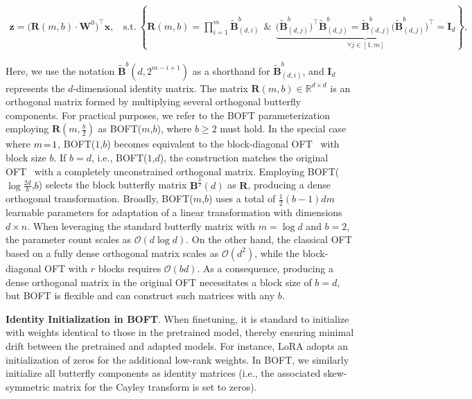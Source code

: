 \begin{equation}
    \begin{aligned}\nonumber
    \bm{z}=\big(\bm{R}(m,b)\cdot\bm{W}^0\big)^\top\bm{x},~~~~\text{s.t.}~\left\{\bm{R}(m,b)=\prod_{i=1}^m \tilde{\bm{B}}^b_{(d,i)}~~\&~~\underbrace{\big(\tilde{\bm{B}}^b_{(d,j)}\big)^\top\tilde{\bm{B}}^b_{(d,j)}=\tilde{\bm{B}}^b_{(d,j)}\big(\tilde{\bm{B}}^b_{(d,j)}\big)^\top\!=\bm{I}_d}_{\forall j\in [1, m]}\right\},
    \end{aligned}
\end{equation}

Here, we use the notation $\tilde{\bm{B}}^b(d,2^{m - i+1})$ as a shorthand for $\tilde{\bm{B}}^b_{(d,i)}$, and $\bm{I}_d$ represents the $d$-dimensional identity matrix. The matrix $\bm{R}(m,b)\in\mathbb{R}^{d\times d}$ is an orthogonal matrix formed by multiplying several orthogonal butterfly components. For practical purposes, we refer to the BOFT parameterization employing $\bm{R}(m,\frac{b}{2})$ as BOFT($m$,$b$), where $b\geq 2$ must hold. In the special case where $\thickmuskip=2mu \medmuskip=2mu m=1$, BOFT($1$,$b$) becomes equivalent to the block-diagonal OFT~\cite{qiu2023controlling} with block size $b$. If $b=d$, i.e., BOFT($1$,$d$), the construction matches the original OFT~\cite{qiu2023controlling} with a completely unconstrained orthogonal matrix. Employing BOFT($\log \frac{2d}{b}$,$b$) selects the block butterfly matrix $\bm{B}^{\frac{b}{2}}(d)$ as $\bm{R}$, producing a dense orthogonal transformation. Broadly, BOFT($m$,$b$) uses a total of $\frac{1}{2}(b-1)dm$ learnable parameters for adaptation of a linear transformation with dimensions $d\times n$. When leveraging the standard butterfly matrix with $m=\log d$ and $b=2$, the parameter count scales as $\mathcal{O}(d\log d)$. On the other hand, the classical OFT based on a fully dense orthogonal matrix scales as $\mathcal{O}(d^2)$, while the block-diagonal OFT with $r$ blocks requires $\mathcal{O}(bd)$. As a consequence, producing a dense orthogonal matrix in the original OFT necessitates a block size of $b=d$, but BOFT is flexible and can construct such matrices with any $b$.

\textbf{Identity Initialization in BOFT}. When finetuning, it is standard to initialize with weights identical to those in the pretrained model, thereby ensuring minimal drift between the pretrained and adapted models. For instance, LoRA adopts an initialization of zeros for the additional low-rank weights. In BOFT, we similarly initialize all butterfly components as identity matrices (i.e., the associated skew-symmetric matrix for the Cayley transform is set to zeros).

